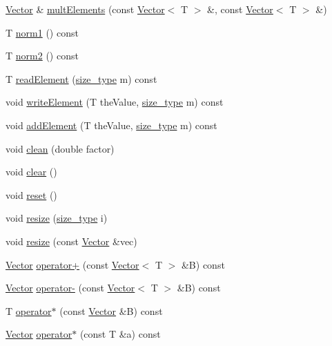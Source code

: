 \begin{DoxyCompactItemize}
\item 
\hyperlink{classlmx_1_1Vector}{Vector} \& \hyperlink{classlmx_1_1Vector_a1aefc241385130c01630fd1fa6e05c5d}{mult\-Elements} (const \hyperlink{classlmx_1_1Vector}{Vector}$<$ T $>$ \&, const \hyperlink{classlmx_1_1Vector}{Vector}$<$ T $>$ \&)
\item 
T \hyperlink{classlmx_1_1Vector_ab671ff37259e9f166954a17db0f90abd}{norm1} () const 
\item 
T \hyperlink{classlmx_1_1Vector_aca60cec2ef0c54e2fe8164b0c842a3d9}{norm2} () const 
\item 
T \hyperlink{classlmx_1_1Vector_a4fc2d153c9436f3d377c1867b608ddd7}{read\-Element} (\hyperlink{lmx__mat__data_8h_a49b489a408a211a90e766329c0732d7b}{size\-\_\-type} m) const 
\item 
void \hyperlink{classlmx_1_1Vector_a6ec5ff5f7a9c2b558fcb09a95210b18a}{write\-Element} (T the\-Value, \hyperlink{lmx__mat__data_8h_a49b489a408a211a90e766329c0732d7b}{size\-\_\-type} m) const 
\item 
void \hyperlink{classlmx_1_1Vector_a59791f8101325539050e3c766249cd13}{add\-Element} (T the\-Value, \hyperlink{lmx__mat__data_8h_a49b489a408a211a90e766329c0732d7b}{size\-\_\-type} m) const 
\item 
void \hyperlink{classlmx_1_1Vector_a769b859af68fab4e61808879d2f49306}{clean} (double factor)
\item 
void \hyperlink{classlmx_1_1Vector_ae4b5507b9269f8b8b03069884bfb4bd8}{clear} ()
\item 
void \hyperlink{classlmx_1_1Vector_a2b0d3ad0094653f9e5827a1df5e837e7}{reset} ()
\item 
void \hyperlink{classlmx_1_1Vector_ad8179e765582ef9d534b777f25265068}{resize} (\hyperlink{lmx__mat__data_8h_a49b489a408a211a90e766329c0732d7b}{size\-\_\-type} i)
\item 
void \hyperlink{classlmx_1_1Vector_a83ff9c76b09d564e4e2740543cac612a}{resize} (const \hyperlink{classlmx_1_1Vector}{Vector} \&vec)
\item 
\hyperlink{classlmx_1_1Vector}{Vector} \hyperlink{classlmx_1_1Vector_a218f21e3c90b9ca7a0b61917a2f5e443}{operator+} (const \hyperlink{classlmx_1_1Vector}{Vector}$<$ T $>$ \&B) const 
\item 
\hyperlink{classlmx_1_1Vector}{Vector} \hyperlink{classlmx_1_1Vector_a8e82d10ac24a5e899f4e36b81360b070}{operator-\/} (const \hyperlink{classlmx_1_1Vector}{Vector}$<$ T $>$ \&B) const 
\item 
T \hyperlink{classlmx_1_1Vector_a5b0ee4a4ff4ee19ea237f3935c7890bb}{operator$\ast$} (const \hyperlink{classlmx_1_1Vector}{Vector} \&B) const 
\item 
\hyperlink{classlmx_1_1Vector}{Vector} \hyperlink{classlmx_1_1Vector_a824e1bde12226255c419baef4f876647}{operator$\ast$} (const T \&a) const 
\end{DoxyCompactItemize}
